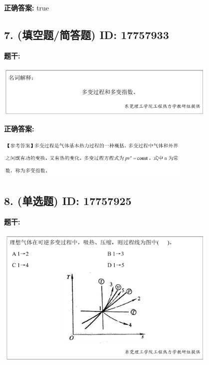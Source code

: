 \documentclass[12pt]{article}
\begin{document}
\textbf{正确答案:}
true

\vspace{0.5em}\hrulefill\vspace{1em}

\subsection*{7. (填空题/简答题) \small ID: 17757933}

\textbf{题干:}


\begin{center}\includegraphics[width=0.8\textwidth, height=0.25\textheight, keepaspectratio]{question_7_17757933/title_img_1.png}\end{center}

\textbf{正确答案:}

\begin{center}\includegraphics[width=0.7\textwidth, height=0.2\textheight, keepaspectratio]{question_7_17757933/correct_answer_1_img_1.png}\end{center}

\vspace{0.5em}\hrulefill\vspace{1em}

\subsection*{8. (单选题) \small ID: 17757925}

\textbf{题干:}


\begin{center}\includegraphics[width=0.8\textwidth, height=0.25\textheight, keepaspectratio]{question_8_17757925/title_img_1.png}\end{center}
\end{document}

